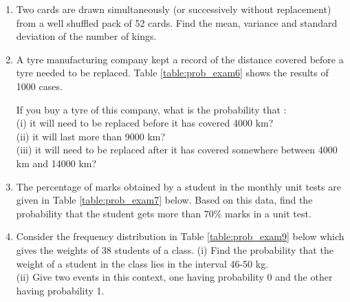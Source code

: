 \begin{enumerate}[label=\thesection.\arabic*.,ref=\thesection.\theenumi]
\item Two cards are drawn simultaneously (or successively without replacement) from a well shuffled pack of 52 cards. Find the mean, variance and standard deviation of the number of kings.\\
\item A tyre manufacturing company kept a record of the distance covered
before a tyre needed to be replaced. Table \ref{table:prob_exam6}
shows the results of 1000 cases.
\begin{table}[!ht]
\centering
{}
\caption{}
\label{table:prob_exam6}
\end{table}
If you buy a tyre of this company, what is the probability that :\\
(i) it will need to be replaced before it has covered 4000 km?\\
(ii) it will last more than 9000 km?\\
(iii) it will need to be replaced after it has covered somewhere between 4000 km and 14000 km?\\
\solution


\item The percentage of marks obtained by a student in the monthly unit tests are given in Table \ref{table:prob_exam7}
below.
Based on this data, find the probability that the student gets more than 70$\%$ marks in a unit test.\\

\begin{table}[!ht]
\centering
{}
\caption{}
\label{table:prob_exam7}
\end{table}
\solution

\item Consider the frequency distribution in Table \ref{table:prob_exam9} below which gives the weights of 38 students of a class.
(i) Find the probability that the weight of a student in the class lies in the interval 46-50 kg.\\
(ii) Give two events in this context, one having probability 0 and the other having probability 1.


\end{enumerate}
